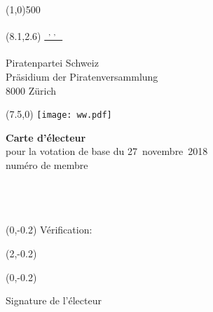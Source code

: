 \documentclass[11pt, a4paper]{scrartcl}
\newcommand{\votingdate}{27~novembre~2018}
\begin{document}
{\begin{minipage}[t][13.42cm][t]{\textwidth}
\end{minipage}

\line(1,0){500}
\vspace{1cm}

\begin{minipage}[t][12.5cm][t]{\textwidth}

\begin{textblock}{9}(8.1,2.6)
\underline{\textsuperscript*{ \givenname~\surname, \street, \postalcode~\location }} \\
\vspace{-0.3cm} \\
Piratenpartei Schweiz \\
Präsidium der Piratenversammlung \\
8000 Zürich
\end{textblock}

\begin{textblock}{6}(7.5,0)
\texttt{[image: ww.pdf]}
\end{textblock}

{\LARGE\textbf{Carte d'électeur}} \\
pour la votation de base du \votingdate{} \\

numéro de membre \textbf{\id}   \\
\givenname~\surname         \\
\street                     \\
\postalcode~\location       \\
%

\begin{textblock}{6}(0,-0.2)
Vérification:
\end{textblock}

\begin{textblock}{4}(2,-0.2)
\raggedright
\code
\end{textblock}

\vspace{4cm}

\begin{textblock}{6}(0,-0.2)
\begin{framed}
Signature de l'électeur \\
\vspace{1.5cm} ~ \\
\end{framed}
\end{textblock}


\end{minipage}}
\end{document}
